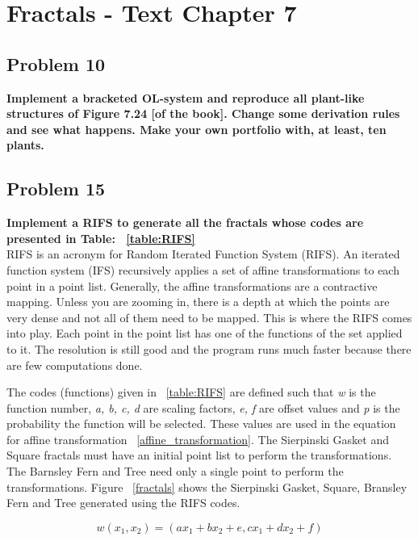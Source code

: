 
\chapter{Fractals - Text Chapter 7}

\section{Problem 10}
\textbf{ Implement a bracketed OL-system and reproduce all plant-like structures of Figure 7.24 [of the book]. Change some derivation rules and see what happens. Make your own portfolio with, at least, ten plants. }

\section{Problem 15}
\textbf{ Implement a RIFS to generate all the fractals whose codes are presented in Table: ~\ref{table:RIFS} } \\
\newline
RIFS is an acronym for Random Iterated Function System (RIFS). An iterated function system (IFS) recursively applies a set of affine transformations to each point in a point list. Generally, the affine transformations are a contractive mapping.  Unless you are zooming in, there is a depth at which the points are very dense and not all of them need to be mapped. This is where the RIFS comes into play. Each point in the point list has one of the functions of the set applied to it. The resolution is still good and the program runs much faster because there are few computations done. 

The codes (functions) given in ~\ref{table:RIFS} are defined such that \textit{w} is the function number, \textit{a, b, c, d} are scaling factors, \textit{e, f} are offset values and \textit{p} is the probability the function will be selected. These values are used in the equation for affine transformation ~\ref{affine_transformation}. The Sierpinski Gasket and Square fractals must have an initial point list to perform the transformations. The Barnsley Fern and Tree need only a single point to perform the transformations. Figure ~\ref{fractals} shows the Sierpinski Gasket, Square, Bransley Fern and Tree generated using the RIFS codes. 

\begin{equation}
w(x_1 , x_2) = ( a x_1 + b x_2 + e, c x_1 + d x_2 + f )
\end{equation} \label{affine_transformation}

